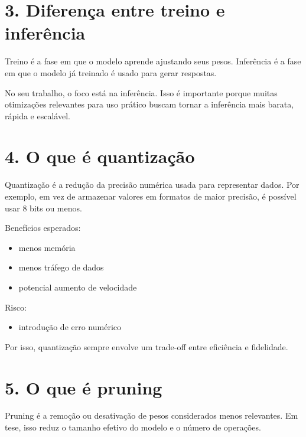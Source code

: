 \section{3. Diferença entre treino e inferência}




Treino é a fase em que o modelo aprende ajustando seus pesos. Inferência é a fase em que o modelo já treinado é usado para gerar respostas.




No seu trabalho, o foco está na inferência. Isso é importante porque muitas otimizações relevantes para uso prático buscam tornar a inferência mais barata, rápida e escalável.



\section{4. O que é quantização}




Quantização é a redução da precisão numérica usada para representar dados. Por exemplo, em vez de armazenar valores em formatos de maior precisão, é possível usar 8 bits ou menos.



Benefícios esperados:

\begin{itemize}
\item menos memória
\item menos tráfego de dados
\item potencial aumento de velocidade
\end{itemize}


Risco:

\begin{itemize}
\item introdução de erro numérico
\end{itemize}


Por isso, quantização sempre envolve um trade-off entre eficiência e fidelidade.



\section{5. O que é pruning}




Pruning é a remoção ou desativação de pesos considerados menos relevantes. Em tese, isso reduz o tamanho efetivo do modelo e o número de operações.



